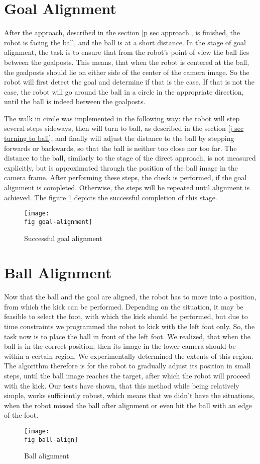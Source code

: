 \section{Goal Alignment}

After the approach, described in the section \ref{p sec approach}, is finished,
the robot is facing the ball, and the ball is at a short distance. In the stage
of goal alignment, the task is to ensure that from the robot's point of view
the ball lies between the goalposts. This means, that when the robot is
centered at the ball, the goalposts should lie on either side of the center of
the camera image. So the robot will first detect the goal and determine if that
is the case. If that is not the case, the robot will go around the ball in a
circle in the appropriate direction, until the ball is indeed between the
goalposts.

The walk in circle was implemented in the following way: the robot will step
several steps sideways, then will turn to ball, as described in the section
\ref{j sec turning to ball}, and finally will adjust the distance to the ball
by stepping forwards or backwards, so that the ball is neither too close nor
too far. The distance to the ball, similarly to the stage of the direct
approach, is not measured explicitly, but is approximated through the position
of the ball image in the camera frame. After performing these steps, the check
is performed, if the goal alignment is completed. Otherwise, the steps will be
repeated until alignment is achieved. The figure \ref{p figure goal-alignment}
depicts the successful completion of this stage.

\begin{figure}[ht]
  \texttt{[image: \\fig goal-alignment]}
  \caption{Successful goal alignment}
  \label{p figure goal-alignment}
\end{figure}

\section{Ball Alignment}

Now that the ball and the goal are aligned, the robot has to move into a
position, from which the kick can be performed. Depending on the situation, it
may be feasible to select the foot, with which the kick should be performed,
but due to time constraints we programmed the robot to kick with the left foot
only. So, the task now is to place the ball in front of the left foot. We
realized, that when the ball is in the correct position, then its image in the
lower camera should be within a certain region. We experimentally determined
the extents of this region. The algorithm therefore is for the robot to
gradually adjust its position in small steps, until the ball image reaches the
target, after which the robot will proceed with the kick. Our tests have shown,
that this method while being relatively simple, works sufficiently robust,
which means that we didn't have the situations, when the robot missed the ball
after alignment or even hit the ball with an edge of the foot.

\begin{figure}[ht]
  \texttt{[image: \\fig ball-align]}
  \caption{Ball alignment}
  \label{p figure ball-alignment}
\end{figure}
